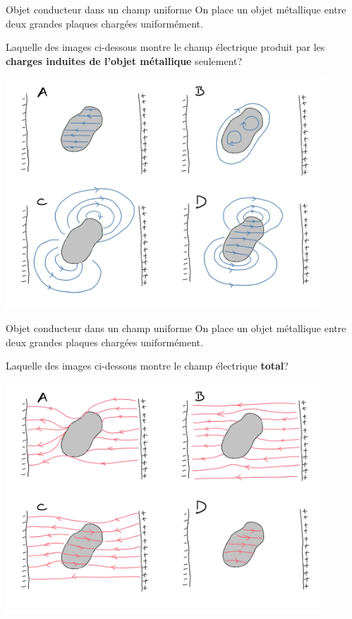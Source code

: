\documentclass{beamer}
\begin{document}
\begin{frame}[t]{Objet conducteur dans un champ uniforme}
  On place un objet métallique entre deux grandes plaques chargées
  uniformément.

  Laquelle des images ci-dessous montre
  le champ électrique produit par les \textbf{charges induites de l'objet
    métallique} seulement?


  \begin{center}
    \includegraphics[width=0.9\textwidth]{figures/champ_uniforme_champ_blob.png}
  \end{center}
\end{frame}


\begin{frame}[t]{Objet conducteur dans un champ uniforme}
  On place un objet métallique entre deux grandes plaques chargées
  uniformément.

  Laquelle des images ci-dessous montre
  le champ électrique \textbf{total}?
  \vspace{\baselineskip}


  \begin{center}
    \includegraphics[width=0.9\textwidth]{figures/champ_uniforme_champ_net.png}
  \end{center}
\end{frame}
\end{document}
